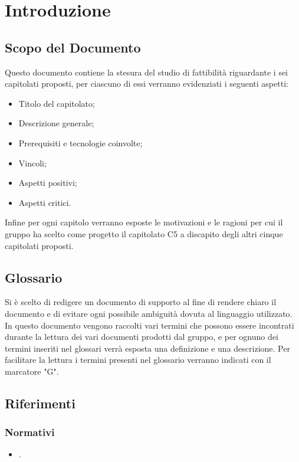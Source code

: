\section{Introduzione}
\subsection{Scopo del Documento}
Questo documento contiene la stesura del studio di fattibilità riguardante i sei capitolati proposti, per ciascuno di essi verranno evidenziati i seguenti aspetti:
\begin{itemize}
\item Titolo del capitolato;
\item Descrizione generale;
\item Prerequisiti e tecnologie coinvolte;
\item Vincoli;
\item Aspetti positivi;
\item Aspetti critici.
\end{itemize}
Infine per ogni capitolo verranno esposte le motivazioni e le ragioni per cui il gruppo ha scelto come progetto il capitolato C5 \NomeProgetto{} a discapito degli altri cinque capitolati proposti.

\subsection{Glossario}
Si è scelto di redigere un documento di supporto  al fine di rendere chiaro il documento e di evitare ogni possibile ambiguità dovuta al linguaggio utilizzato. In questo documento vengono raccolti vari termini che possono essere incontrati durante la lettura dei vari documenti prodotti dal gruppo, e per ognuno dei termini inseriti nel glossari  verrà esposta una definizione e una descrizione. Per facilitare la lettura i termini presenti nel glossario verranno indicati con il marcatore "G".
	
\subsection{Riferimenti}

\subsubsection{Normativi}
\begin{itemize}
\item {}.
\end{itemize}

